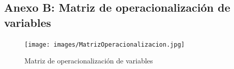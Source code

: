 \documentclass[12pt, a4paper]{article}
\begin{document}
\subsection*{Anexo B: Matriz de operacionalización de variables}

\begin{landscape}
    \begin{figure}[H]
        \begin{center}
            \texttt{[image: images/MatrizOperacionalizacion.jpg]}
        \end{center}
        \label{fig:MatrizOperacionalizacion}
        \caption{Matriz de operacionalización de variables}
    \end{figure}
\end{landscape}


\end{document}
